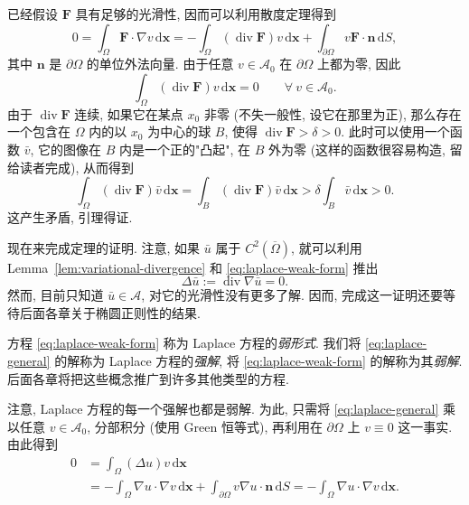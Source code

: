 \begin{Proof}
\begin{Lemma}
\end{Lemma}

\begin{Proof}
已经假设 $\bm{F}$ 具有足够的光滑性, 因而可以利用散度定理得到
\begin{equation}\label{eq:variational-divergence-theorem}
0=\int_\Omega\bm{F}\cdot\nabla v\,\mathrm{d}\bm{x}=-\int_\Omega(\operatorname{div}\bm{F})v\,\mathrm{d}\bm{x}+\int_{\partial\Omega}v\bm{F}\cdot\bm{n}\,\mathrm{d}S,
\end{equation}
其中 $\bm{n}$ 是 $\partial\Omega$ 的单位外法向量. 由于任意 $v\in\mathcal{A}_0$ 在 $\partial\Omega$ 上都为零, 因此
\begin{equation}\label{eq:divergence-test-integral-zero}
\int_\Omega(\operatorname{div}\bm{F})v\,\mathrm{d}\bm{x}=0\qquad\forall\ v\in\mathcal{A}_0.
\end{equation}
由于 $\operatorname{div}\bm{F}$ 连续, 如果它在某点 $x_0$ 非零 (不失一般性, 设它在那里为正), 那么存在一个包含在 $\Omega$ 内的以 $x_0$ 为中心的球 $B$, 使得 $\operatorname{div}\bm{F}>\delta>0$. 此时可以使用一个函数 $\bar v$, 它的图像在 $B$ 内是一个正的"凸起", 在 $B$ 外为零 (这样的函数很容易构造, 留给读者完成), 从而得到
\begin{equation}\label{eq:positive-test-function-contradiction}
\int_\Omega(\operatorname{div}\bm{F})\bar v\,\mathrm{d}\bm{x}=\int_B(\operatorname{div}\bm{F})\bar v\,\mathrm{d}\bm{x}>\delta\int_B\bar v\,\mathrm{d}\bm{x}>0.
\end{equation}
这产生矛盾, 引理得证.
\end{Proof}

现在来完成定理的证明. 注意, 如果 $\bar u$ 属于 $C^2(\overline\Omega)$, 就可以利用 Lemma~\ref{lem:variational-divergence} 和 \eqref{eq:laplace-weak-form} 推出
\begin{equation}\label{eq:minimizer-strong-laplace}
\Delta\bar u:=\operatorname{div}\nabla\bar u=0.
\end{equation}
然而, 目前只知道 $\bar u\in\mathcal{A}$, 对它的光滑性没有更多了解. 因而, 完成这一证明还要等待后面各章关于椭圆正则性的结果.\end{Proof}

方程 \eqref{eq:laplace-weak-form} 称为 Laplace 方程的\emph{弱形式}. 我们将 \eqref{eq:laplace-general} 的解称为 Laplace 方程的\emph{强解}, 将 \eqref{eq:laplace-weak-form} 的解称为其\emph{弱解}. 后面各章将把这些概念推广到许多其他类型的方程.

注意, Laplace 方程的每一个强解也都是弱解. 为此, 只需将 \eqref{eq:laplace-general} 乘以任意 $v\in\mathcal{A}_0$, 分部积分 (使用 Green 恒等式), 再利用在 $\partial\Omega$ 上 $v\equiv0$ 这一事实. 由此得到
\begin{equation}\label{eq:strong-to-weak-green-identity}
\begin{aligned}
0&=\int_\Omega(\Delta u)v\,\mathrm{d}\bm{x}\\
&=-\int_\Omega\nabla u\cdot\nabla v\,\mathrm{d}\bm{x}
+\int_{\partial\Omega}v\nabla u\cdot\bm{n}\,\mathrm{d}S
=-\int_\Omega\nabla u\cdot\nabla v\,\mathrm{d}\bm{x}.
\end{aligned}
\end{equation}


